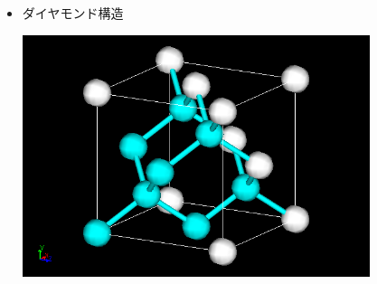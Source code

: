 \documentclass[12pt, dvipdfmx]{beamer}
\begin{document}
\begin{frame}
\begin{columns}[totalwidth=1\textwidth]
\begin{itemize}
				\item ダイヤモンド構造

				\includegraphics[width=0.8\textwidth]{dia.png}

			\end{itemize}
	\end{columns}
\end{frame}
\end{document}
